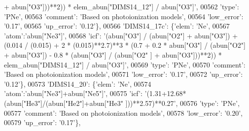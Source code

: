 \begin{DoxyCode}
{       + abun["O3"]))**2)) * elem\_abun["DIMS14\_12"] / abun["O3"]'},
00562                                        \textcolor{stringliteral}{'type'}: \textcolor{stringliteral}{'PNe'},
00563                                        \textcolor{stringliteral}{'comment'}: \textcolor{stringliteral}{'Based on photoionization models'},
00564                                        \textcolor{stringliteral}{'low\_error'}: \textcolor{stringliteral}{'0.17'},
00565                                        \textcolor{stringliteral}{'up\_error'}: \textcolor{stringliteral}{'0.12'}\},
00566                          \textcolor{stringliteral}{'DIMS14\_17c'}: \{\textcolor{stringliteral}{'elem'}: \textcolor{stringliteral}{'Ne'},
00567                                        \textcolor{stringliteral}{'atom'}:\textcolor{stringliteral}{'abun["Ne3"]'}, 
00568                                        \textcolor{stringliteral}{'icf'}: \textcolor{stringliteral}{'(abun["O3"] / (abun["O2"] + abun["O3"]) + (0.014 / (0.015) +
       2 * (0.015)**2.7)**3 * (0.7 + 0.2 * abun["O3"] / (abun["O2"] + abun["O3"]) - 0.8 * (abun["O3"] / (abun["O2"
      ] + abun["O3"]))**2)) * elem\_abun["DIMS14\_12"] / abun["O3"]'},
00569                                        \textcolor{stringliteral}{'type'}: \textcolor{stringliteral}{'PNe'},
00570                                        \textcolor{stringliteral}{'comment'}: \textcolor{stringliteral}{'Based on photoionization models'},
00571                                        \textcolor{stringliteral}{'low\_error'}: \textcolor{stringliteral}{'0.17'},
00572                                        \textcolor{stringliteral}{'up\_error'}: \textcolor{stringliteral}{'0.12'}\},
00573                          \textcolor{stringliteral}{'DIMS14\_20'}: \{\textcolor{stringliteral}{'elem'}: \textcolor{stringliteral}{'Ne'},
00574                                        \textcolor{stringliteral}{'atom'}:\textcolor{stringliteral}{'abun["Ne3"]+abun["Ne5"]'}, 
00575                                        \textcolor{stringliteral}{'icf'}: \textcolor{stringliteral}{'(1.31+12.68*(abun["He3"]/(abun["He2"]+abun["He3"
      ]))**2.57)**0.27'},
00576                                        \textcolor{stringliteral}{'type'}: \textcolor{stringliteral}{'PNe'},
00577                                        \textcolor{stringliteral}{'comment'}: \textcolor{stringliteral}{'Based on photoionization models'},
00578                                        \textcolor{stringliteral}{'low\_error'}: \textcolor{stringliteral}{'0.20'},
00579                                        \textcolor{stringliteral}{'up\_error'}: \textcolor{stringliteral}{'0.17'}\},

\end{DoxyCode}
